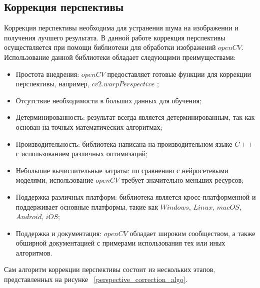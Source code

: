 \subsection{Коррекция перспективы}

Коррекция перспективы необходима для устранения шума на изображении и получения лучшего результата. 
В данной работе коррекция перспективы осуществляется при помощи библиотеки для обработки изображений $openCV$. Использование данной библиотеки обладает следующими преимуществами:
\begin{itemize}
    \item Простота внедрения: $openCV$ предоставляет готовые функции для коррекции перспективы, например, $cv2.warpPerspective$ \cite{opencv_perspective_transform};
    \item Отсутствие необходимости в больших данных для обучения;
    \item Детерминированность: результат всегда является детерминированным, так как основан на точных математических алгоритмах;
    \item Производительность: библиотека написана на производительном языке $C++$ с использованием различных оптимизаций;
    \item Небольшие вычислительные затраты: по сравнению с нейросетевыми моделями, использование $openCV$ требует значительно меньших ресурсов;
    \item Поддержка различных платформ: библиотека является кросс-платформенной и поддерживает основные платформы, такие как $Windows$, $Linux$, $macOS$, $Android$, $iOS$;
    \item Поддержка и документация: $openCV$ обладает широким сообществом, а также обширной документацией с примерами использования тех или иных алгоритмов.
\end{itemize}

Сам алгоритм коррекции перспективы состоит из нескольких этапов, представленных на рисунке ~\ref{perspective_correction_algo}. 

